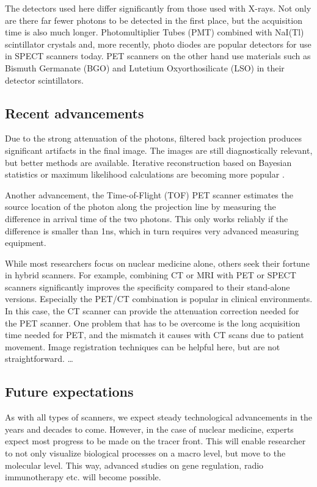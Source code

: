 The detectors used here differ significantly from those used with X-rays. Not
only are there far fewer photons to be detected in the first place, but the
acquisition time is also much longer. Photomultiplier Tubes (PMT) combined with
NaI(Tl) scintillator crystals and, more recently, photo diodes are popular
detectors for use in SPECT scanners today. PET scanners on the other hand use
materials such as Bismuth Germanate (BGO) and Lutetium Oxyorthosilicate (LSO) in
their detector scintillators.

\subsection{Recent advancements}
Due to the strong attenuation of the photons, filtered back projection produces
significant artifacts in the final image. The images are still diagnostically
relevant, but better methods are available. Iterative reconstruction based on
Bayesian statistics or maximum likelihood calculations are becoming more
popular \cite{suetens}.

Another advancement, the Time-of-Flight (TOF) PET scanner estimates the
source location of the photon along the projection line by measuring the
difference in arrival time of the two photons. This only works reliably if the
difference is smaller than 1ns, which in turn requires very advanced measuring
equipment.

While most researchers focus on nuclear medicine alone, others seek their
fortune in hybrid scanners. For example, combining CT or MRI with PET or SPECT
scanners significantly improves the specificity compared to their stand-alone
versions. Especially the PET/CT combination is popular in clinical environments.
In this case, the CT scanner can provide the attenuation correction needed for
the PET scanner. One problem that has to be overcome is the long acquisition
time needed for PET, and the mismatch it causes with CT scans due to patient
movement. Image registration techniques can be helpful here, but are not
straightforward.
\ldots

\subsection{Future expectations}
As with all types of scanners, we expect steady technological advancements in
the years and decades to come. However, in the case of nuclear medicine, experts
expect most progress to be made on the tracer front. This will enable researcher
to not only visualize biological processes on a macro level, but move to the
molecular level. This way, advanced studies on gene regulation, radio
immunotherapy etc. will become possible.